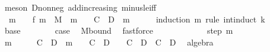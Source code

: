 \begin{isabellebody}
\ {\isacharparenleft}{\kern0pt}meson\ D{\isacharunderscore}{\kern0pt}nonneg\ add{\isacharunderscore}{\kern0pt}increasing{}\ minus{\isacharunderscore}{\kern0pt}le{\isacharunderscore}{\kern0pt}iff{\isacharparenright}{\kern0pt}\isanewline
\ \ \isanewline
\ \ \ \ \isamarkupfalse%
\ {\isacharasterisk}{\kern0pt}{\isacharcolon}{\kern0pt}\ {\isachardoublequoteopen}m\ {\isachargreater}{\kern0pt}\ {}\ {\isasymLongrightarrow}\ f\ {\isacharparenleft}{\kern0pt}m\ {\isacharasterisk}{\kern0pt}\ M{\isacharparenright}{\kern0pt}\ {\isasymge}\ {\isacharparenleft}{\kern0pt}m\ {\isacharplus}{\kern0pt}\ {}{\isacharparenright}{\kern0pt}\ {\isacharasterisk}{\kern0pt}\ {\isacharparenleft}{\kern0pt}C\ {\isacharplus}{\kern0pt}\ D{\isacharparenright}{\kern0pt}{\isachardoublequoteclose}\ \ m\isanewline
\ \ \ \ \isamarkupfalse%
\ {\isacharparenleft}{\kern0pt}induction\ m\ rule{\isacharcolon}{\kern0pt}\ int{\isacharunderscore}{\kern0pt}induct{\isacharbrackleft}{\kern0pt}\ {\isacharquery}{\kern0pt}k{\isacharequal}{\kern0pt}{}{\isacharbrackright}{\kern0pt}{\isacharparenright}{\kern0pt}\isanewline
\ \ \ \ \ \ \isamarkupfalse%
\ base\isanewline
\ \ \ \ \ \ \isamarkupfalse%
\ {\isacharquery}{\kern0pt}case\ \isamarkupfalse%
\ M{\isacharunderscore}{\kern0pt}bound\ \isamarkupfalse%
\ fastforce\isanewline
\ \ \ \ \isamarkupfalse%
\isanewline
\ \ \ \ \ \ \isamarkupfalse%
\ {\isacharparenleft}{\kern0pt}step{}\ m{\isacharparenright}{\kern0pt}\isanewline
\ \ \ \ \ \ \isamarkupfalse%
\ {\isachardoublequoteopen}{\isacharparenleft}{\kern0pt}m\ {\isacharplus}{\kern0pt}\ {}\ {\isacharplus}{\kern0pt}\ {}{\isacharparenright}{\kern0pt}\ {\isacharasterisk}{\kern0pt}\ {\isacharparenleft}{\kern0pt}C\ {\isacharplus}{\kern0pt}\ D{\isacharparenright}{\kern0pt}\ {\isacharequal}{\kern0pt}\ {\isacharparenleft}{\kern0pt}m\ {\isacharplus}{\kern0pt}\ {}{\isacharparenright}{\kern0pt}\ {\isacharasterisk}{\kern0pt}\ {\isacharparenleft}{\kern0pt}C\ {\isacharplus}{\kern0pt}\ D{\isacharparenright}{\kern0pt}\ {\isacharplus}{\kern0pt}\ {}\ {\isacharasterisk}{\kern0pt}\ {\isacharparenleft}{\kern0pt}C\ {\isacharplus}{\kern0pt}\ D{\isacharparenright}{\kern0pt}\ {\isacharminus}{\kern0pt}\ {\isacharparenleft}{\kern0pt}C\ {\isacharplus}{\kern0pt}\ D{\isacharparenright}{\kern0pt}{\isachardoublequoteclose}\ \isamarkupfalse%
\ algebra\isanewline

\end{isabellebody}
